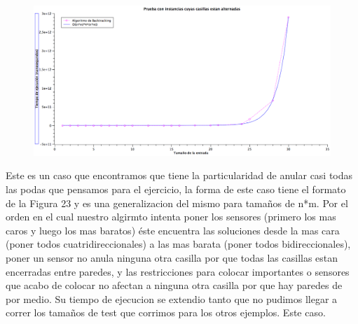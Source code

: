 \begin{figure}[H] %
\begin{center}
\includegraphics[width=460pt]{../imgs/graficoej3_alternado.png}
\end{center}
\end{figure}

Este es un caso que encontramos que tiene la particularidad de anular casi todas las podas que pensamos para el ejercicio, la forma de este caso tiene el formato de la Figura 23 y es una generalizacion del mismo para tamaños de n*m. Por el orden en el cual nuestro algirmto intenta poner los sensores (primero los mas caros y luego los mas baratos) éste encuentra las soluciones desde la mas cara (poner todos cuatridireccionales) a las mas barata (poner todos bidireccionales), poner un sensor no anula ninguna otra casilla por que todas las casillas estan encerradas entre paredes, y las restricciones para colocar importantes o sensores que acabo de colocar no afectan a ninguna otra casilla por que hay paredes de por medio. Su tiempo de ejecucion se extendio tanto que no pudimos llegar a correr los tamaños de test que corrimos para los otros ejemplos. Este caso.

